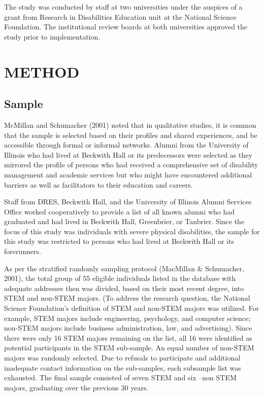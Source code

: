 \documentclass[11.5pt]{sig-alternate} %
\begin{document}
\begin{large}
The study was conducted by staff at two universities under the auspices of a grant from Research in Disabilities Education unit at the National Science Foundation. The institutional review boards at both universities approved the study prior to implementation.

\section*{METHOD}
\subsection*{Sample}
McMillan and Schumacher (2001) noted that in qualitative studies, it is common that the sample is selected based on their profiles and shared experiences, and be accessible through formal or informal networks. Alumni from the University of Illinois who had lived at Beckwith Hall or its predecessors were selected as they mirrored the profile of persons who had received a comprehensive set of disability management and academic services but who might have encountered additional barriers as well as facilitators to their education and careers.

Staff from DRES, Beckwith Hall, and the University of Illinois Alumni Services Office worked cooperatively to provide a list of all known alumni who had graduated and had lived in Beckwith Hall, Greenbrier, or Tanbrier. Since the focus of this study was individuals with severe physical disabilities, the sample for this study was restricted to persons who had lived at Beckwith Hall or its forerunners. 

As per the stratified randomly sampling protocol (MacMillan \& Schumacher, 2001), the total group of 55 eligible individuals listed in the database with adequate addresses then was divided, based on their most recent degree, into STEM and non-STEM majors. (To address the research question, the National Science Foundation's definition of STEM and non-STEM majors was utilized. For example, STEM majors include engineering, psychology, and computer science; non-STEM majors include business administration, law, and advertising). Since there were only 16 STEM majors remaining on the list, all 16 were identified as potential participants in the STEM sub-sample. An equal number of non-STEM majors was randomly selected. Due to refusals to participate and additional inadequate contact information on the sub-samples, each subsample list was exhausted. The final sample consisted of seven STEM and six –non STEM majors, graduating over the previous 30 years.


\end{large}
\end{document}
